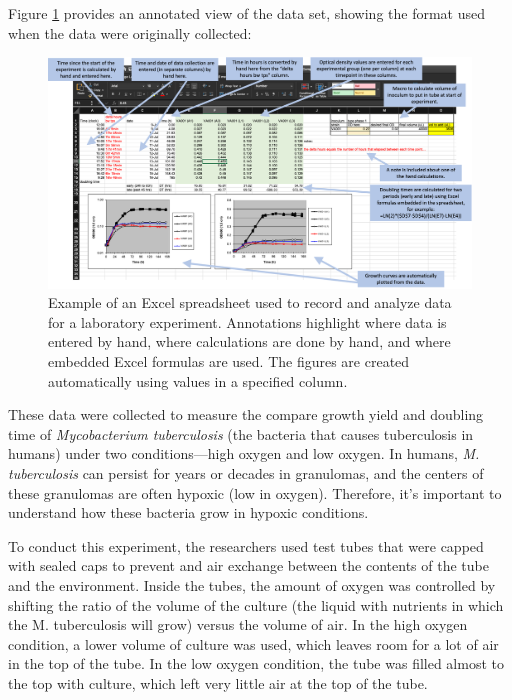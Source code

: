 \documentclass[]{tufte-book}
\begin{document}
Figure \ref{fig:growthexcel1} provides an annotated view of the data set, showing
the format used when the data were originally collected:

\begin{figure}
\includegraphics[width=\textwidth]{figures/growth_curve_example} \caption[Example of an Excel spreadsheet used to record and analyze data for a laboratory experiment]{Example of an Excel spreadsheet used to record and analyze data for a laboratory experiment. Annotations highlight where data is entered by hand, where calculations are done by hand, and where embedded Excel formulas are used. The figures are created automatically using values in a specified column.}\label{fig:growthexcel1}
\end{figure}

These data were collected to measure the compare growth yield and doubling time
of \emph{Mycobacterium tuberculosis} (the bacteria that causes tuberculosis in
humans) under two conditions---high oxygen and low oxygen. In humans, \emph{M.
tuberculosis} can persist for years or decades in granulomas, and the centers of
these granulomas are often hypoxic (low in oxygen). Therefore, it's important to
understand how these bacteria grow in hypoxic conditions.

To conduct this experiment, the researchers used test tubes that were capped
with sealed caps to prevent and air exchange between the contents of the tube
and the environment. Inside the tubes, the amount of oxygen was controlled
by shifting the ratio of the volume of the culture (the liquid with nutrients
in which the M. tuberculosis will grow) versus the volume of air.
In the high oxygen condition, a lower volume of culture was used, which leaves
room for a lot of air in the top of the tube. In the low oxygen condition,
the tube was filled almost to the top with culture, which left very little air
at the top of the tube.
\end{document}

